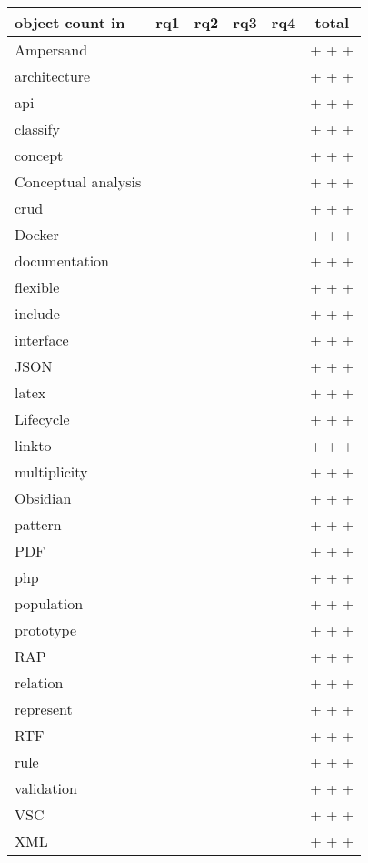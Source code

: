 \newcommand\tottab[1]{{#1} & \the\value{rq1-#1} & \the\value{rq2-#1} & \the\value{rq3-#1} & \the\value{rq4-#1} & \xintexpr \the\value{rq1-#1} + \the\value{rq2-#1} +\the\value{rq3-#1} +\the\value{rq4-#1} \relax \\ \hline}

\begin{tabular}{ || l | c | c | c |c|c||}
    \hline
    object count in & rq1 & rq2 & rq3 & rq4 & total\\
    \hline\hline

    \tottab{Ampersand} 
    \tottab{architecture}
    \tottab{api}
    \tottab{classify}      
    \tottab{concept}     
    \tottab{Conceptual analysis}
    \tottab{crud}           
    \tottab{Docker}   
    \tottab{documentation}
    \tottab{flexible}    
    \tottab{include}
    \tottab{interface}     
    \tottab{JSON}
    \tottab{latex}   
    \tottab{Lifecycle}
    \tottab{linkto}        
    \tottab{multiplicity}  
    \tottab{Obsidian}
    \tottab{pattern}
    \tottab{PDF}
    \tottab{php}
    \tottab{population}    
    \tottab{prototype}
    \tottab{RAP}            
    \tottab{relation}
    \tottab{represent}      
    \tottab{RTF}
    \tottab{rule}
    \tottab{validation}
    \tottab{VSC}
    \tottab{XML}

\end{tabular}

